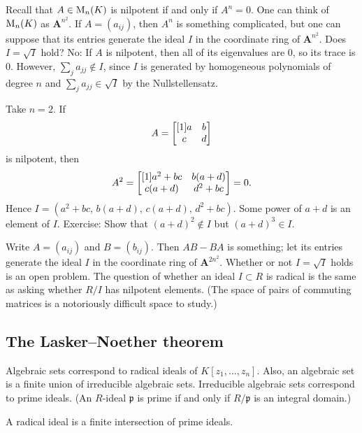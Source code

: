 \documentclass [11 pt, oneside] {article}
\begin{document}
\begin{example}\label{}
Recall that $A\in \operatorname{M}_n(K)$ is nilpotent if and only if $A^n = 0$. One can think of $\operatorname{M}_n(K)$ as $\mathbf{A}^{n^2}$. If $A = (a_{ij})$, then $A^n$ is something complicated, but one can suppose that its entries generate the ideal $I$ in the coordinate ring of $\mathbf{A}^{n^2}$. Does $I=\sqrt{I} $ hold? No: If $A$ is nilpotent, then all of its eigenvalues are $0$, so its trace is $0$. However, $\sum_{j}^{} a_{jj}\notin I$, since $I$ is generated by homogeneous polynomials of degree $n$ and $\sum_{j}^{} a_{jj} \in \sqrt{I} $ by the Nullstellensatz.

Take $n=2$. If 
\begin{align*}
	A = \begin{bmatrix} [1] a&b\\c&d\end{bmatrix}
\end{align*}
is nilpotent, then
\begin{align*}
	A^2 = \begin{bmatrix} [1] a^2 + bc&b(a+d)\\c (a+d) &d^2 + bc\end{bmatrix} = 0.
\end{align*}
Hence $I=   (a^2+bc,\, b(a+d), \,c (a+d),\,d^2 + bc)$. Some power of $a+d$ is an element of $I$. Exercise: Show that $(a+d)^2\notin I$ but $(a+d)^3\in I$.
\end{example}

\begin{example}\label{}
Write $A=(a_{ij})$ and $B=(b_{ij})$. Then $AB-BA$ is something; let its entries generate the ideal $I$ in the coordinate ring of $\mathbf{A}^{2n^2}$. Whether or not $I=\sqrt{I} $ holds is an open problem. The question of whether an ideal $I\subset R$ is radical is the same as asking whether $R/I$ has nilpotent elements. (The space of pairs of commuting matrices is a notoriously difficult space to study.)
\end{example}

\subsection{The Lasker--Noether theorem}
Algebraic sets correspond to radical ideals of $K[z_1,\hdots, z_n]$. Also, an algebraic set is a finite union of irreducible algebraic sets. Irreducible algebraic sets correspond to prime ideals. (An $R$-ideal $\mathfrak{p}$ is prime if and only if $R/\mathfrak{p}$ is an integral domain.)

\begin{theorem}[ ]\label{}\index{}
A radical ideal is a finite intersection of prime ideals.
\end{theorem}
\end{document}
